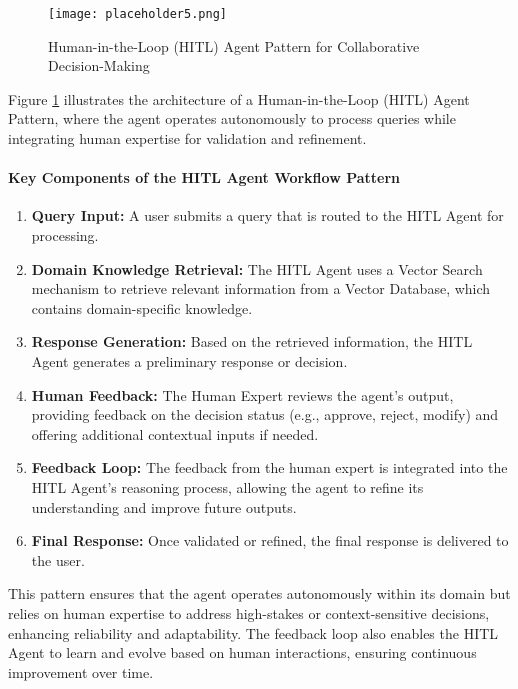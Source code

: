 \documentclass[12pt]{article}
\begin{document}
\begin{figure}[h!]
    \centering
    \texttt{[image: placeholder5.png]}
    \caption{Human-in-the-Loop (HITL) Agent Pattern for Collaborative Decision-Making}
    \label{fig:hitl_agent}
\end{figure}

Figure \ref{fig:hitl_agent} illustrates the architecture of a Human-in-the-Loop (HITL) Agent Pattern, where the agent operates autonomously to process queries while integrating human expertise for validation and refinement.

\newpage
\paragraph{Key Components of the HITL Agent Workflow Pattern}
\begin{enumerate}
    \item \textbf{Query Input:} A user submits a query that is routed to the HITL Agent for processing.
    \item \textbf{Domain Knowledge Retrieval:} The HITL Agent uses a Vector Search mechanism to retrieve relevant information from a Vector Database, which contains domain-specific knowledge.
    \item \textbf{Response Generation:} Based on the retrieved information, the HITL Agent generates a preliminary response or decision.
    \item \textbf{Human Feedback:} The Human Expert reviews the agent's output, providing feedback on the decision status (e.g., approve, reject, modify) and offering additional contextual inputs if needed.
    \item \textbf{Feedback Loop:} The feedback from the human expert is integrated into the HITL Agent's reasoning process, allowing the agent to refine its understanding and improve future outputs.
    \item \textbf{Final Response:} Once validated or refined, the final response is delivered to the user.
\end{enumerate}

This pattern ensures that the agent operates autonomously within its domain but relies on human expertise to address high-stakes or context-sensitive decisions, enhancing reliability and adaptability. The feedback loop also enables the HITL Agent to learn and evolve based on human interactions, ensuring continuous improvement over time.
\end{document}
